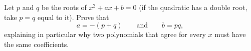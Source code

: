 Let $p$ and $q$ be the roots of $x^2+ax+b=0$ (if the quadratic has a double root, take $p=q$ equal to it). Prove that
\[a=-(p+q)\qquad\text{and}\qquad b=pq,\]
explaining in particular why two polynomials that agree for every $x$ must have the same coefficients.
